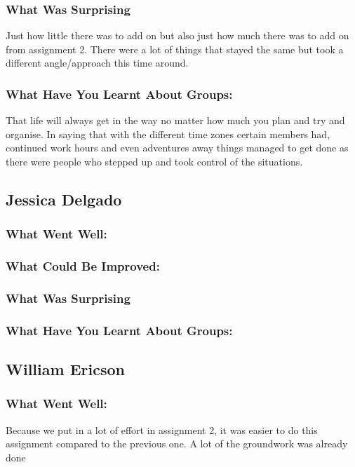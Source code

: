 \documentclass[11pt, oneside, a4paper, titlepage]{article}
\begin{document}
\subsubsection{What Was Surprising}
Just how little there was to add on but also just how much there was to add on from assignment 2. There were a lot of things that stayed the same but took a different angle/approach this time around. 

\subsubsection{What Have You Learnt About Groups:}
That life will always get in the way no matter how much you plan and try and organise. In saying that with the different time zones certain members had, continued work hours and even adventures away things managed to get done as there were people who stepped up and took control of the situations.  

\subsection{Jessica Delgado}
\subsubsection{What Went Well:}


\subsubsection{What Could Be Improved:}


\subsubsection{What Was Surprising}


\subsubsection{What Have You Learnt About Groups:}


\subsection{William Ericson}
\subsubsection{What Went Well:}
Because we put in a lot of effort in assignment 2, it was easier to do this assignment compared to the previous one. A lot of the groundwork was already done 
\end{document}

